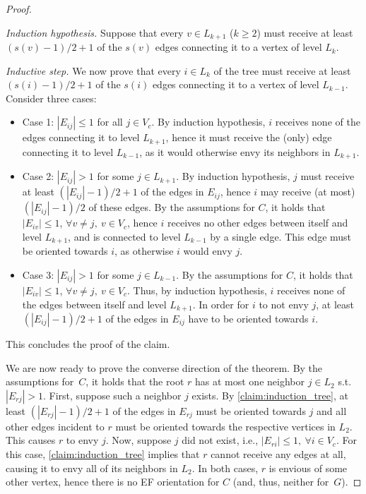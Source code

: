 \documentclass[11pt,letterpaper]{article}
\begin{document}
\begin{proof}
\begin{nestedproof}
    \emph{Induction hypothesis.} Suppose that every $v\in L_{k+1}$ ($k\geq 2$) must receive at least $(s(v)-1)/2 +1$ of the $s(v)$ edges connecting it to a vertex of level $L_k$.

    \emph{Inductive step.} We now prove that every $i\in L_k$ of the tree must receive at least $(s(i)-1)/2 +1$ of the $s(i)$ edges connecting it to a vertex of level $L_{k-1}$. Consider three cases:
    \begin{itemize}
        \item Case 1: $|E_{ij}|\leq 1$ for all $j\in V_c$. By induction hypothesis, $i$ receives none of the edges connecting it to level $L_{k+1}$, hence it must receive the (only) edge connecting it to level $L_{k-1}$, as it would otherwise envy its neighbors in $L_{k+1}$.
        \item Case 2: $|E_{ij}|>1$ for some $j\in L_{k+1}$. By induction hypothesis, $j$ must receive at least $(|E_{ij}|-1)/2 +1$ of the edges in $E_{ij}$, hence $i$ may receive (at most) $(|E_{ij}|-1)/2$ of these edges. By the assumptions for $C$, it holds that $|E_{iv}| \leq 1$, $\forall v\neq j,\ v\in V_c$, hence $i$ receives no other edges between itself and level $L_{k+1}$, and is connected to level $L_{k-1}$ by a single edge. This edge must be oriented towards $i$, as otherwise $i$ would envy $j$.
        \item Case 3: $|E_{ij}|>1$ for some $j\in L_{k-1}$. By the assumptions for $C$, it holds that $|E_{iv}| \leq 1$, $\forall v\neq j,\ v\in V_c$. Thus, by induction hypothesis, $i$ receives none of the edges between itself and level $L_{k+1}$. In order for $i$ to not envy $j$, at least $(|E_{ij}|-1)/2 +1$ of the edges in $E_{ij}$ have to be oriented towards $i$.
    \end{itemize}
    This concludes the proof of the claim.
    \end{nestedproof}
    We are now ready to prove the converse direction of the theorem. By the assumptions for~$C$, it holds that the root $r$ has at most one neighbor $j\in L_{2}$ s.t. $|E_{rj}|>1$. First, suppose such a neighbor $j$ exists. By \cref{claim:induction_tree}, at least $(|E_{rj}|-1)/2 +1$ of the edges in $E_{rj}$ must be oriented towards $j$ and all other edges incident to $r$ must be oriented towards the respective vertices in $L_{2}$. This causes $r$ to envy $j$. Now, suppose $j$ did not exist, i.e., $|E_{ri}|\leq 1,\ \forall i\in V_c$. For this case, \cref{claim:induction_tree} implies that $r$ cannot receive any edges at all, causing it to envy all of its neighbors in $L_2$. In both cases, $r$ is envious of some other vertex, hence there is no EF orientation for $C$ (and, thus, neither for~$G$).
\end{proof}
\end{document}
